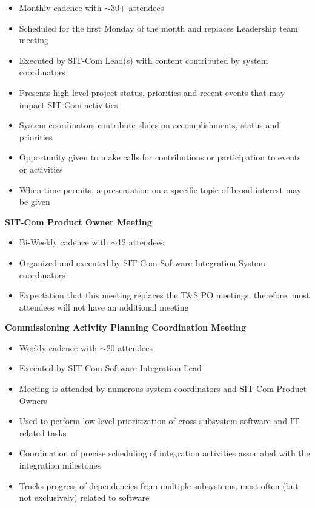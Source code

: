 \documentclass[SE,lsstdraft,authoryear,toc]{lsstdoc}
\begin{document}
\begin{itemize}
    \item Monthly cadence with $\sim$30+ attendees
    \item Scheduled for the first Monday of the month and replaces Leadership team meeting
    \item Executed by SIT-Com Lead(s) with content contributed by system coordinators
    \item Presents high-level project status, priorities and recent events that may impact SIT-Com activities
    \item System coordinators contribute slides on accomplishments, status and priorities
    \item Opportunity given to make calls for contributions or participation to events or activities
    \item When time permits, a presentation on a specific topic of broad interest may be given
\end{itemize}

\textbf{SIT-Com Product Owner Meeting}
\begin{itemize}
    \item Bi-Weekly cadence with $\sim$12 attendees
    \item Organized and executed by SIT-Com Software Integration System coordinators
    \item Expectation that this meeting replaces the T\&S PO meetings, therefore, most attendees will not have an additional meeting
\end{itemize}


\textbf{Commissioning Activity Planning Coordination Meeting}
\begin{itemize}
    \item Weekly cadence with $\sim$20 attendees
    \item Executed by SIT-Com Software Integration Lead
    \item Meeting is attended by numerous system coordinators and SIT-Com Product Owners
    \item Used to perform low-level prioritization of cross-subsystem software and IT related tasks
    \item Coordination of precise scheduling of  integration activities associated with the integration milestones
    \item Tracks progress of dependencies from multiple subsystems, most often (but not exclusively) related to software
\end{itemize}
\end{document}
